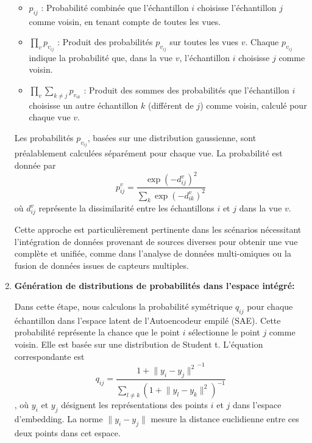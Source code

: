 \begin{enumerate}
                    \begin{itemize}
                      \item \( p_{ij} \) : Probabilité combinée que l'échantillon \( i \) choisisse l'échantillon \( j \) comme voisin, en tenant compte de toutes les vues.
                      \item \( \prod_v p_{v_{ij}} \) : Produit des probabilités \( p_{v_{ij}} \) sur toutes les vues \( v \). Chaque \( p_{v_{ij}} \) indique la probabilité que, dans la vue \( v \), l'échantillon \( i \) choisisse \( j \) comme voisin.
                      \item \( \prod_v \sum_{k \neq j} p_{v_{ik}} \) : Produit des sommes des probabilités que l'échantillon \( i \) choisisse un autre échantillon \( k \) (différent de \( j \)) comme voisin, calculé pour chaque vue \( v \).
                    \end{itemize}
            
                    Les probabilités \( p_{v_{ij}} \), basées sur une distribution gaussienne, sont préalablement calculées séparément pour chaque vue. La probabilité est donnée par 
                        \begin{equation}
                             p_{ij}^v = \frac{\exp{(-d_{ij}^v)^2}}{\sum_{k}{\exp{(-d_{ik}^v)^2}}} 
                         \end{equation}
                    où \( d_{ij}^v \) représente la dissimilarité entre les échantillons \( i \) et \( j \) dans la vue \( v \). 
                    
                    Cette approche est particulièrement pertinente dans les scénarios nécessitant l'intégration de données provenant de sources diverses pour obtenir une vue complète et unifiée, comme dans l'analyse de données multi-omiques ou la fusion de données issues de capteurs multiples.

            
            \item\textbf{Génération de distributions de probabilités dans l'espace intégré:} 
                
               Dans cette étape, nous calculons la probabilité symétrique \( q_{ij} \) pour chaque échantillon dans l'espace latent de l'Autoencodeur empilé (SAE). Cette probabilité représente la chance que le point \( i \) sélectionne le point \( j \) comme voisin. Elle est basée sur une distribution de Student t. L'équation correspondante est 
               \begin{equation}
                 q_{ij} = \frac{{1 + \lVert y_i - y_j \rVert^2}^{-1}}{\sum_{l \neq k}{(1 + \lVert y_l - y_k \rVert^2)^{-1}}} 
               \end{equation}
               , 
               où \( y_i \) et \( y_j \) désignent les représentations des points \( i \) et \( j \) dans l'espace d'embedding. La norme \( \lVert y_i - y_j \rVert \) mesure la distance euclidienne entre ces deux points dans cet espace.
            

\end{enumerate}
